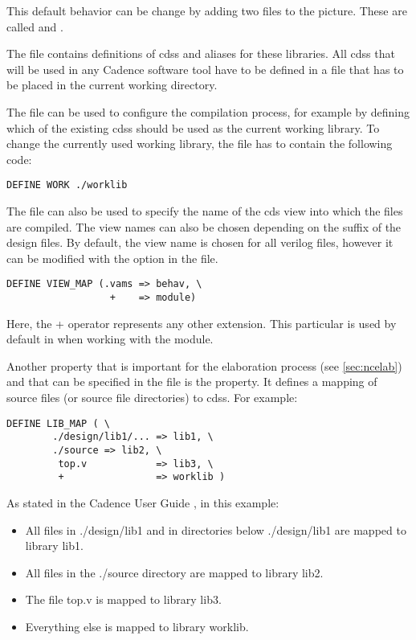 This default behavior can be change by adding two files to the picture. These
are called  and .

The  file contains definitions of \glspl{cds}
and aliases for these libraries. All \glspl{cds} that will be used in any
Cadence software tool have to be defined in a  file that has to be
placed in the current working directory.

The  file can be used to configure the
compilation process, for example by defining which of the existing \glspl{cds}
should be used as the current working library. To change the currently used
working library, the  file has to contain the following code:
\begin{verbatim}
DEFINE WORK ./worklib
\end{verbatim}

The  file can also be used to specify the name of the \gls{cds}
view into which the  files are compiled. The view names can also be
chosen depending on the suffix of the design files. By default, the view name
 is chosen for all verilog files, however it can be modified with
the  option in the  file.
\begin{verbatim}
DEFINE VIEW_MAP (.vams => behav, \
                  +    => module)
\end{verbatim}
Here, the + operator represents any other extension. This particular
\ti{VIEW\_MAP} is used by default in \ti{brICk} when working with the
\ti{cadence\_ius} module.

Another property that is important for the elaboration process (see
\cref{sec:ncelab}) and that can be specified in the \ti{hdl.var} file is the
\ti{LIB\_MAP} property. It defines a mapping of source files (or source file
directories) to \glspl{cds}. For example:
\begin{verbatim}
DEFINE LIB_MAP ( \
        ./design/lib1/... => lib1, \
        ./source => lib2, \
         top.v            => lib3, \
         +                => worklib )
\end{verbatim}

As stated in the Cadence User Guide \citep{cds2014compverilog}, in this example:
\begin{itemize}
    \item All files in ./design/lib1 and in directories below ./design/lib1 are
 mapped to library lib1.
    \item All files in the ./source directory are mapped to library lib2.
    \item The file top.v is mapped to library lib3.
    \item Everything else is mapped to library worklib.
\end{itemize}

